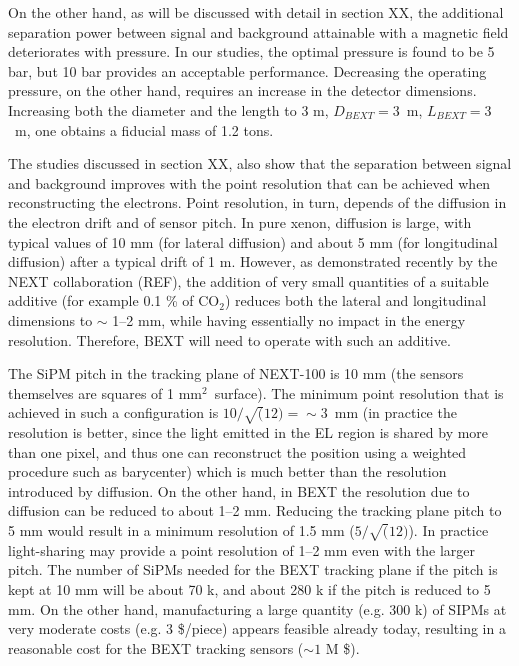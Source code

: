On the other hand, as will be discussed with detail in section XX, the additional separation power between signal and background attainable with a magnetic field deteriorates with pressure. In our studies, the optimal pressure is found to be 5 bar, but 10 bar provides an acceptable performance. Decreasing the operating pressure, on the other hand, requires an increase in the detector dimensions. Increasing both the diameter and the length to 3 m,
$D_{BEXT} = 3$~m, $L_{BEXT} = 3$~m, one obtains a fiducial mass of 1.2 tons. 

The studies discussed in section XX, also show that the separation between signal and background improves with the point resolution that can be achieved when reconstructing the electrons. Point resolution, in turn, depends of the diffusion in the electron drift and of sensor pitch. In pure xenon, diffusion is large, with typical values of 10 mm (for lateral diffusion) and about 5 mm (for longitudinal diffusion) after a typical drift of 1 m. However, as demonstrated recently by the NEXT collaboration (REF), the addition of very small quantities of a suitable additive (for example 0.1 \% of CO$_2$) reduces both the lateral and longitudinal dimensions to $\sim$ 1--2 mm, while having essentially no impact in the energy resolution. Therefore, BEXT will need to operate with such an additive. 

The SiPM pitch in the tracking plane of NEXT-100 is 10 mm (the sensors themselves are squares of 1 mm$^2$~surface). The minimum point resolution that is achieved in such a configuration is $10/\sqrt(12) = \sim 3$~mm (in practice the resolution is better, since the light emitted in the EL region is shared by more than one pixel, and thus one can reconstruct the position using a weighted procedure such as barycenter) which is much better than the resolution introduced by diffusion. On the other hand, in BEXT the resolution due to diffusion can be reduced to about 1--2 mm. Reducing the tracking plane pitch to 5 mm would result in a minimum resolution of 1.5 mm ($5/\sqrt(12)$). In practice light-sharing may provide a point resolution of 1--2 mm even with the larger pitch. The number of SiPMs needed for the BEXT tracking plane if the pitch is kept at 10 mm will be about 70 k, and about 280 k if the pitch is reduced to 5 mm. On the other hand, manufacturing a large quantity (e.g. 300 k) of SIPMs at very moderate costs (e.g. 3 \$/piece) appears feasible already today, resulting in a reasonable cost for the BEXT tracking sensors ($\sim 1$ M \$).  

